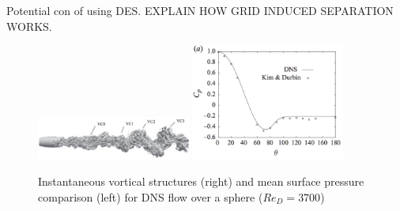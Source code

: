 \documentclass[journal]{new-aiaa}
\begin{document}
Potential con of using DES. EXPLAIN HOW GRID INDUCED SEPARATION WORKS.


















\begin{figure}[H]
\begin{center}
\includegraphics[width=0.45\textwidth]{Images/logan/rodriguez2011direct_DNSsphereWake.pdf}
\includegraphics[width=0.45\textwidth]{Images/logan/rodriguez2011direct_DNSsphereCp.pdf}
\caption{ Instantaneous vortical structures (right) and mean surface pressure comparison (left) for DNS flow over a sphere ($Re_D = 3700$) \cite{rodriguez2011direct} }
\label{fig:dnssphere}
\end{center}
\end{figure}
\end{document}
